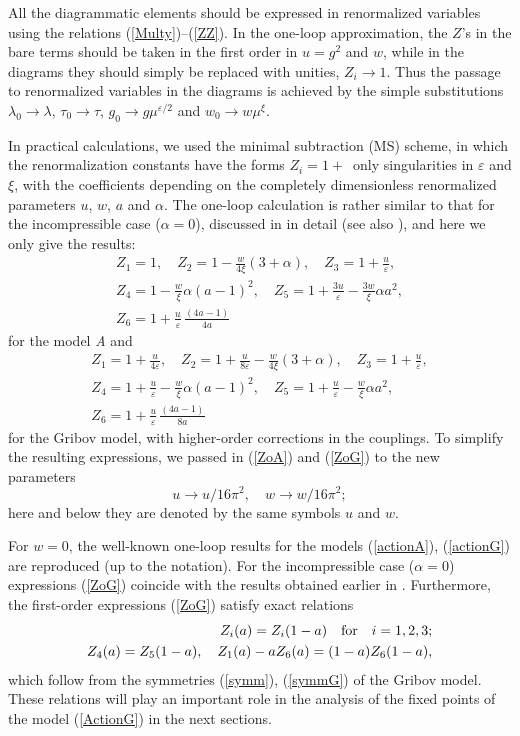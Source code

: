 \documentclass[12pt]{iopart}
\begin{document}
All the diagrammatic elements should be expressed in renormalized variables
using the relations (\ref{Multy})--(\ref{ZZ}). In the one-loop approximation,
the $Z$'s in the bare terms should be taken in the first order in $u= g^{2}$
and $w$, while in the diagrams they should simply be replaced with unities,
$Z_{i} \to 1$. Thus the passage to renormalized variables in the diagrams
is achieved by the simple substitutions
$\lambda_{0} \to \lambda$, $\tau_{0} \to \tau$,
$g_{0} \to g\mu^{\varepsilon/2}$ and $w_{0} \to w\mu^{\xi}$.

In practical calculations, we used the minimal subtraction (MS) scheme,
in which the renormalization constants have the forms $Z_{i}=1+\,$ only
singularities in $\varepsilon$ and $\xi$, with the coefficients depending
on the completely dimensionless renormalized parameters $u$, $w$, $a$ and
$\alpha$. The one-loop calculation is rather similar to that for the
incompressible case ($\alpha=0$), discussed in \cite{AIK} in detail
(see also \cite{AHH,Alexa}), and here we only give the results:
\begin{eqnarray}
Z_{1} = 1, \quad  Z_{2} = 1 - \frac{w}{4\xi}(3+\alpha), \quad
Z_{3} = 1 + \frac{u}{\varepsilon}, \nonumber \\
Z_{4} = 1 - \frac{w}{\xi} \alpha (a-1)^{2} , \quad
Z_{5} = 1 + \frac{3u}{\varepsilon} - \frac{3w}{\xi} \alpha a^{2},
\nonumber \\
Z_{6} = 1 + \frac{u}{\varepsilon}\, \frac{(4a-1)}{4a}
\label{ZoA}
\end{eqnarray}
for the model {\it A} and
\begin{eqnarray}
Z_{1} = 1 + \frac{u}{4\varepsilon}, \quad
Z_{2} = 1 + \frac{u}{8\varepsilon} - \frac{w}{4\xi}(3+\alpha), \quad
Z_{3} = 1 + \frac{u}{\varepsilon}, \nonumber \\
Z_{4} = 1 + \frac{u}{\varepsilon} - \frac{w}{\xi} \alpha (a-1)^{2} , \quad
Z_{5} = 1 + \frac{u}{\varepsilon} - \frac{w}{\xi} \alpha a^{2}, \nonumber \\
Z_{6} = 1 + \frac{u}{\varepsilon}\, \frac{(4a-1)}{8a}
\label{ZoG}
\end{eqnarray}
for the Gribov model, with higher-order corrections in the couplings.
To simplify the resulting expressions, we passed in (\ref{ZoA})
and (\ref{ZoG}) to the new parameters
\[ u \to u/16\pi^2, \quad w \to w/16\pi^2; \]
here and below they are denoted by the same symbols $u$ and $w$.

For $w=0$, the well-known one-loop results for the models (\ref{actionA}),
(\ref{actionG}) are reproduced (up to the notation). For the incompressible
case ($\alpha=0$) expressions (\ref{ZoG}) coincide with the results obtained
earlier in \cite{AIK}. Furthermore, the first-order expressions (\ref{ZoG})
satisfy exact relations
\begin{eqnarray}
Z_{i} (a) = Z_{i} (1-a) \quad {\rm for} \quad i=1,2,3; \nonumber \\
Z_{4} (a) = Z_{5} (1-a), \quad
Z_{1} (a) -a Z_{6}(a) = (1-a) Z_{6}(1-a),
\label{GSymm}
\end{eqnarray}
which follow from the symmetries (\ref{symm}), (\ref{symmG}) of the Gribov
model. These relations will play an important role in the analysis of the
fixed points of the model (\ref{ActionG}) in the next sections.
\end{document}
